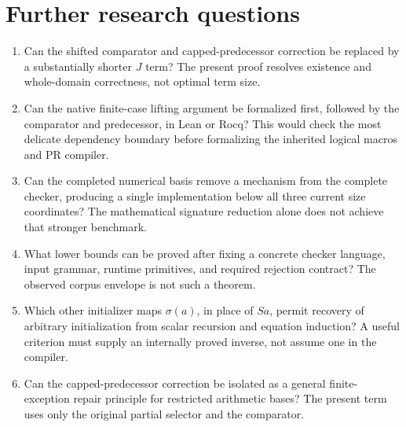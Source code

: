 \documentclass[11pt,letterpaper]{article}
\theoremstyle{definition}\newtheorem{definition}[theorem]{Definition}
\theoremstyle{remark}\newtheorem{remark}[theorem]{Remark}
\begin{document}


\section{Further research questions}
\begin{enumerate}
\item Can the shifted comparator and capped-predecessor correction be
replaced by a substantially shorter $J$ term? The present proof resolves
existence and whole-domain correctness, not optimal term size.
\item Can the native finite-case lifting argument be formalized first,
followed by the comparator and predecessor, in Lean or Rocq? This would
check the most delicate dependency boundary before formalizing the
inherited logical macros and PR compiler.
\item Can the completed numerical basis remove a mechanism from the
complete checker, producing a single implementation below all three
current size coordinates? The mathematical signature reduction alone
does not achieve that stronger benchmark.
\item What lower bounds can be proved after fixing a concrete checker
language, input grammar, runtime primitives, and required rejection
contract? The observed corpus envelope is not such a theorem.
\item Which other initializer maps $\sigma(a)$, in place of $Sa$, permit
recovery of arbitrary initialization from scalar recursion and equation
induction? A useful criterion must supply an internally proved inverse,
not assume one in the compiler.
\item Can the capped-predecessor correction be isolated as a general
finite-exception repair principle for restricted arithmetic bases? The
present term uses only the original partial selector and the comparator.
\end{enumerate}

\appendix


\end{document}
